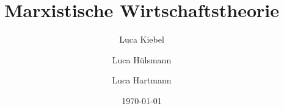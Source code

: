 \documentclass[10pt,a4paper, ngerman]{beamer}
\author{Luca Kiebel \and Luca Hülsmann \and Luca Hartmann}
\title{Marxistische Wirtschaftstheorie}
\date{\today}
\institute[HBBK]{Hans-Böckler-Berufskolleg}
\begin{document}
\begin{frame}
\titlepage
\end{frame}
\end{document}
